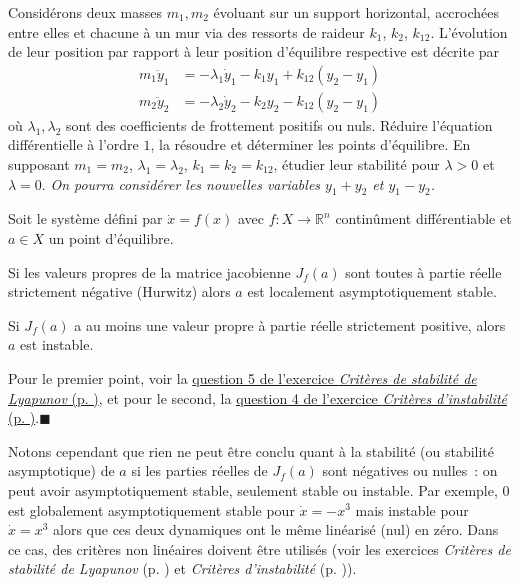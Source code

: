 
Considérons deux masses \(m_1,m_2\) évoluant sur un support horizontal,
accrochées entre elles et chacune à un mur via des ressorts de raideur
\(k_1\), \(k_2\), \(k_{12}\). L'évolution de leur position par rapport à
leur position d'équilibre respective est décrite par
\begin{align*}
m_1\ddot{y}_1 &= - \lambda_1 \dot{y}_1 - k_1 y_1 + k_{12} (y_2-y_1) \\
m_2\ddot{y}_2 &= - \lambda_2 \dot{y}_2 - k_2 y_2 - k_{12} (y_2-y_1)
\end{align*} où \(\lambda_1,\lambda_2\) sont des coefficients de
frottement positifs ou nuls. Réduire l'équation différentielle à l'ordre
\(1\), la résoudre et déterminer les points d'équilibre. En supposant
\(m_1=m_2\), \(\lambda_1=\lambda_2\), \(k_1=k_2=k_{12}\), étudier leur
stabilité pour \(\lambda>0\) et \(\lambda = 0\). \emph{On pourra
considérer les nouvelles variables \(y_1+y_2\) et \(y_1-y_2\).}

\hypertarget{theo_linTangent}{}
\begin{theoreme}\label{theo_linTangent}
Soit le système défini par \(\dot x = f(x)\) avec
\(f:X \to \mathbb{R}^n\) continûment différentiable et \(a\in X\) un
point d'équilibre.

Si les valeurs propres de la matrice jacobienne \(J_f(a)\) sont toutes à
partie réelle strictement négative (Hurwitz) alors \(a\) est localement
asymptotiquement stable.

Si \(J_f(a)\) a au moins une valeur propre à partie réelle strictement
positive, alors \(a\) est instable.
\end{theoreme}

\hypertarget{duxe9monstration-7}{}
\begin{preuve}\label{duxe9monstration-7}
Pour le premier point, voir la
\protect\hyperlink{lyap-5}{question 5 de l'exercice \emph{Critères de
stabilité de Lyapunov} (p. \pageref*{lyap-5})}, et pour le second, la
\protect\hyperlink{instab-4}{question 4 de l'exercice \emph{Critères
d'instabilité} (p. \pageref*{instab-4})}.\hfill$\blacksquare$
\end{preuve}

Notons cependant que rien ne peut être conclu quant à la stabilité (ou
stabilité asymptotique) de \(a\) si les parties réelles de \(J_f(a)\)
sont négatives ou nulles~: on peut avoir asymptotiquement stable,
seulement stable ou instable. Par exemple, 0 est globalement
asymptotiquement stable pour \(\dot{x} = - x^3\) mais instable pour
\(\dot{x} = x^3\) alors que ces deux dynamiques ont le même linéarisé
(nul) en zéro. Dans ce cas, des critères non linéaires doivent être utilisés (voir les exercices \emph{Critères de stabilité de Lyapunov} (p. \pageref*{lyap-5}) et \emph{Critères d'instabilité} (p. \pageref*{instab-4})).

